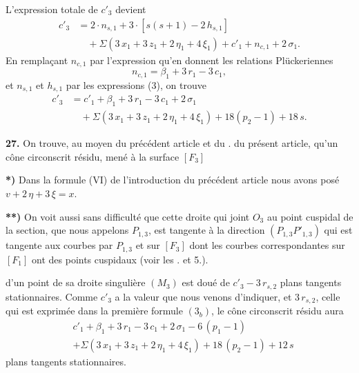 \documentclass{article}
\begin{document}
L'expression totale de $c'_3$ devient
\[
\begin{aligned}
c'_3 &= 2\cdot n_{s, 1} + 3\cdot [s(s + 1) - 2\,h_{s, 1}] \\
&\quad + \Sigma(3\,x_1 + 3\,z_1 + 2\,\eta_1 + 4\,\xi_1) + c'_1 + n_{c, 1} + 2\,\sigma_1.
\end{aligned} \tag{$8_a$}
\]
En remplaçant $n_{c, 1}$ par l'expression qu'en donnent les relations Plückeriennes
\[
n_{c, 1} = \beta_1 + 3\,r_1 - 3\,c_1,
\]
et $n_{s, 1}$ et $h_{s, 1}$ par les expressions (3), on trouve
\[
\begin{aligned}
c'_3 &= c'_1 + \beta_1 + 3\,r_1 - 3\,c_1 + 2\,\sigma_1 \\
&\quad + \Sigma(3\,x_1 + 3\,z_1 + 2\,\eta_1 + 4\,\xi_1) + 18(p_2 - 1) + 18\,s.
\end{aligned} \tag{$8_b$}
\]

\textbf{27.} On trouve, au moyen du précédent article et du . du présent article, qu'un cône circonscrit résidu, mené à la surface $[F_3]$

\textbf{*)} Dans la formule (VI) de l'introduction du précédent article nous avons posé $v + 2\,\eta + 3\,\xi = x$.

\textbf{**)} On voit aussi sans difficulté que cette droite qui joint $O_3$ au point cuspidal de la section, que nous appelons $P_{1, 3}$, est tangente à la direction $(P_{1, 3} P'_{1, 3})$ qui est tangente aux courbes par $P_{1, 3}$ et sur $[F_3]$ dont les courbes correspondantes sur $[F_1]$ ont des points cuspidaux (voir les . et 5.).

d'un point de sa droite singulière $(M_3)$ est doué de $c'_3 - 3\,r_{s, 2}$ plans tangents stationnaires. Comme $c'_3$ a la valeur que nous venons d'indiquer, et $3\,r_{s, 2}$, celle qui est exprimée dans la première formule $(3_b)$, le cône circonscrit résidu aura
\[
\begin{aligned}
& c'_1 + \beta_1 + 3\,r_1 - 3\,c_1 + 2\,\sigma_1 - 6\,(p_1 - 1) \\
& + \Sigma(3\,x_1 + 3\,z_1 + 2\,\eta_1 + 4\,\xi_1) + 18\,(p_2 - 1) + 12\,s
\end{aligned}
\]
plans tangents stationnaires.
\end{document}
